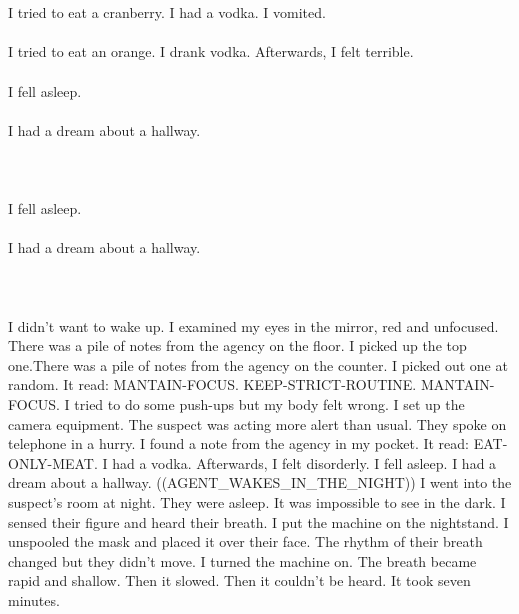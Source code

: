 \documentclass{article}
\begin{document}
    \section{}
    I tried to eat a cranberry. I had a vodka. I vomited.\\\\I tried to eat an orange. I drank vodka. Afterwards, I felt terrible.\\\\I fell asleep.\\\\I had a dream about a hallway.\\\\ 
    \newpage
    
    \section{}
    I fell asleep.\\\\I had a dream about a hallway.\\\\ 
    \newpage
    
    \section{}
    I didn't want to wake up. I examined my eyes in the mirror, red and unfocused. There was a pile of notes from the agency on the floor. I picked up the top one.There was a pile of notes from the agency on the counter. I picked out one at random. It read: MANTAIN-FOCUS. KEEP-STRICT-ROUTINE. MANTAIN-FOCUS. I tried to do some push-ups but my body felt wrong. I set up the camera equipment. The suspect was acting more alert than usual. They spoke on telephone in a hurry. I found a note from the agency in my pocket. It read: EAT-ONLY-MEAT. I had a vodka. Afterwards, I felt disorderly. I fell asleep. I had a dream about a hallway. ((AGENT_WAKES_IN_THE_NIGHT)) I went into the suspect's room at night. They were asleep. It was impossible to see in the dark. I sensed their figure and heard their breath. I put the machine on the nightstand. I unspooled the mask and placed it over their face. The rhythm of their breath changed but they didn't move. I turned the machine on. The breath became rapid and shallow. Then it slowed. Then it couldn't be heard. It took seven minutes. \\\\
    \newpage
    
\end{document}
